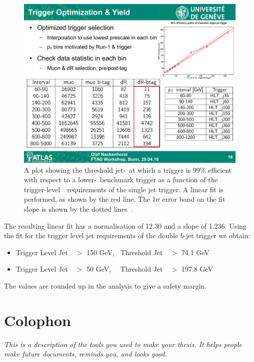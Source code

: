 \begin{figure}[!hbt]
    \begin{center}
        \includegraphics[width=0.6\linewidth, angle=0]{figs/Dibjet/LowMass/jetTriggerTurnOn.pdf}
      \end{center}
  \caption[A plot showing the threshold jet-\pT~at which a trigger is 99\% efficient
             with respect to a lower-\pT~benchmark trigger as a function of the trigger-level~\pT~requirements of the single jet trigger.
             A linear fit is performed, as shown by the red line. The 1$\sigma$ error band on the fit slope is shown by the dotted lines.]
           {A plot showing the threshold jet-\pT~at which a trigger is 99\% efficient
             with respect to a lower-\pT~benchmark trigger as a function of the trigger-level~\pT~requirements of the single jet trigger.
             A linear fit is performed, as shown by the red line. The 1$\sigma$ error band on the fit slope is shown by the dotted lines~\cite{evt-jet_turnOnFit}.}
          \label{fig:triggerTurnOn_fit}
\end{figure}

\noindent
The resulting linear fit has a normalisation of 12.30 and a slope of 1.236.
Using the fit for the trigger level jet requirements of the double $b$-jet trigger we obtain:
\vspace{-0.5em}
\begin{itemize}[leftmargin=*]
\item Trigger Level Jet~\pT~$>$ 150 GeV,~  Threshold Jet~\pT~$>$ 74.1 GeV 
\item Trigger Level Jet~\pT~$>$  50 GeV,~~ Threshold Jet~\pT~$>$ 197.8 GeV
\end{itemize}
\vspace{-0.3em}
\noindent
The values are rounded up in the analysis to give a safety margin.

\chapter{Colophon}
\label{appendixlabel3}
\textit{This is a description of the tools you used to make your thesis. It helps people make future documents, reminds you, and looks good.}

